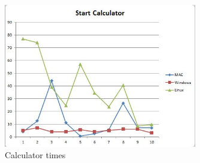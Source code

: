 \documentclass[11pt]{article}
\begin{document}
\begin{figure}[h!]
  \centering
    \includegraphics[width=0.75\textwidth]{./Images/Calculator}
  \caption{Calculator times}
\end{figure}
\end{document}
